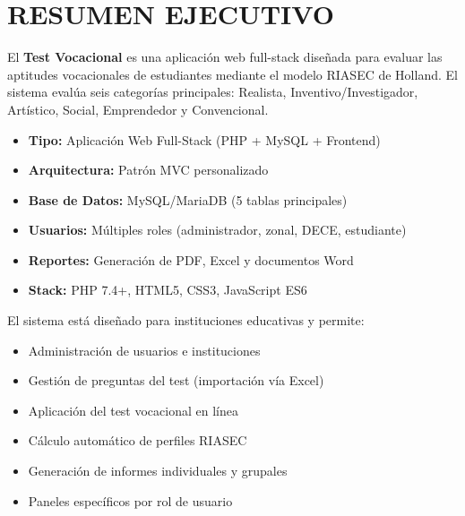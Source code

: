 \documentclass[12pt, a4paper]{report}
\begin{document}
\chapter*{RESUMEN EJECUTIVO}

El \textbf{Test Vocacional} es una aplicación web full-stack diseñada para evaluar las aptitudes vocacionales de estudiantes mediante el modelo RIASEC de Holland. El sistema evalúa seis categorías principales: Realista, Inventivo/Investigador, Artístico, Social, Emprendedor y Convencional.

\begin{itemize}[leftmargin=2cm]
    \item \textbf{Tipo:} Aplicación Web Full-Stack (PHP + MySQL + Frontend)
    \item \textbf{Arquitectura:} Patrón MVC personalizado
    \item \textbf{Base de Datos:} MySQL/MariaDB (5 tablas principales)
    \item \textbf{Usuarios:} Múltiples roles (administrador, zonal, DECE, estudiante)
    \item \textbf{Reportes:} Generación de PDF, Excel y documentos Word
    \item \textbf{Stack:} PHP 7.4+, HTML5, CSS3, JavaScript ES6
\end{itemize}

El sistema está diseñado para instituciones educativas y permite:
\begin{itemize}
    \item Administración de usuarios e instituciones
    \item Gestión de preguntas del test (importación vía Excel)
    \item Aplicación del test vocacional en línea
    \item Cálculo automático de perfiles RIASEC
    \item Generación de informes individuales y grupales
    \item Paneles específicos por rol de usuario
\end{itemize}

\tableofcontents
\newpage
\end{document}

